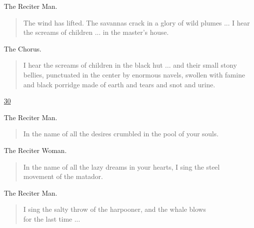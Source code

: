 \documentclass[letterpaper,article,12pt,oneside,notitlepage]{memoir}
\begin{document}
\begin{center}The Reciter Man.\end{center}

\begin{verse}
\indent The wind has lifted. The savannas crack in a glory of wild plumes ... I hear the screams of children ... in the master's house. \\
\end{verse}

\begin{center}The Chorus.\end{center}

\begin{verse}
\indent I hear the screams of children in the black hut ... and their small stony bellies, punctuated in the center by enormous navels, swollen with famine and black porridge made of earth and tears and snot and urine. \\
\end{verse}

\clearpage

\href{http://cesaire.elotroalex.com/chiens/chiens/p030.html}{30}

\begin{center}The Reciter Man.\end{center}

\begin{verse}
\hspace{1cm} In the name of all the desires crumbled in the pool of your souls. \\
\end{verse}

\begin{center}The Reciter Woman.\end{center}

\begin{verse}
\indent In the name of all the lazy dreams in your hearts, I sing the steel movement of the matador. \\
\end{verse}

\begin{center}The Reciter Man.\end{center}

\begin{verse}
\indent I sing the salty throw of the harpooner, and the whale blows \\
for the last time ... \\
\end{verse}
\end{document}
